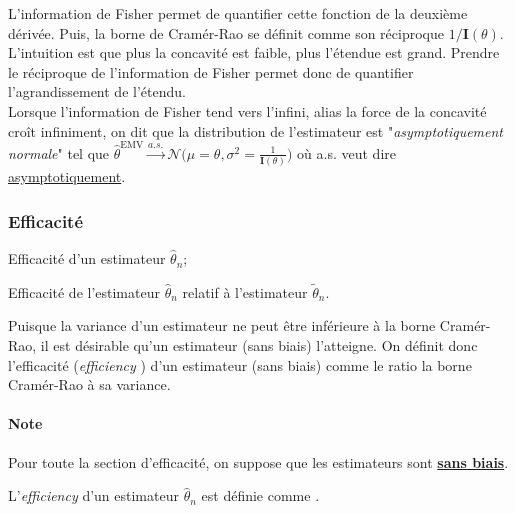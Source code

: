\documentclass[10pt, french]{article}
\begin{document}
\begin{multicols*}{2}
L'information de Fisher permet de quantifier cette fonction de la deuxième dérivée. Puis, la borne de Cramér-Rao se définit comme son réciproque $1 / \bm{I}(\theta)$. L'intuition est que plus la concavité est faible, plus l'étendue est grand. Prendre le réciproque de l'information de Fisher permet donc de quantifier l'agrandissement de l'étendu.\\

Lorsque l'information de Fisher tend vers l'infini, alias la force de la concavité croît infiniment, on dit que la distribution de l'estimateur est "\textit{asymptotiquement normale}" tel que $\hat\theta^{\text{EMV}} \overset{a.s.}{\rightarrow} \mathcal{N}\Big(\mu = \theta, \sigma^{2} = \frac{1}{\bm{I}(\theta)}\Big)$ où a.s. veut dire \hyperlink{asympto}{asymptotiquement}.



\columnbreak
\subsubsection{Efficacité}\label{subsubsec:EfficiencyEstim}
\begin{distributions}[Notation]
\begin{description}[font = \normalfont]
	\item[$\text{eff}(\hat{\theta}_{n})$]	Efficacité d'un estimateur $\hat{\theta}_{n}$;
	\item[$\text{eff}(\hat\theta_{n}, \tilde\theta_{n})$]	Efficacité de l'estimateur $\hat{\theta}_{n}$ relatif à l'estimateur $\tilde{\theta}_{n}$.
\end{description}
\end{distributions}

\begin{rappel_enhanced}[Motivation]
Puisque la variance d'un estimateur ne peut être inférieure à la borne Cramér-Rao, il est désirable qu'un estimateur (sans biais) l'atteigne. On définit donc l'efficacité (\og \textit{efficiency} \fg{}) d'un estimateur (sans biais) comme le ratio la borne Cramér-Rao à sa variance.
\end{rappel_enhanced}

\paragraph{Note}	Pour toute la section d'efficacité, on suppose que les estimateurs sont \underline{\textbf{sans biais}}.

\begin{definitionNOHFILL}
L'\og \textit{efficiency} \fg{} d'un estimateur $\hat{\theta}_{n}$ est définie comme .


\end{definitionNOHFILL}
\end{multicols*}
\end{document}
